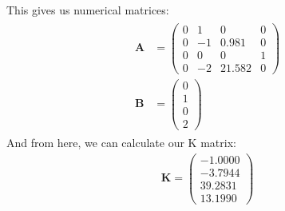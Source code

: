 \documentclass{article}
\theoremstyle{plain}
\theoremstyle{definition}
\theoremstyle{remark}
\begin{document}
This gives us numerical matrices:
\begin{gather*}
    \begin{aligned}
        \textbf{A} &= \begin{pmatrix}
            0 & 1 & 0 & 0 \\
            0 & -1 & 0.981 & 0 \\
            0 & 0 & 0 & 1 \\
            0 & -2 & 21.582 & 0
        \end{pmatrix} \\
        \textbf{B} &= \begin{pmatrix}
            0 \\
            1 \\
            0 \\
            2
        \end{pmatrix}
    \end{aligned}
\end{gather*}
And from here, we can calculate our K matrix:
\begin{gather*}
    \textbf{K} = \begin{pmatrix}
        -1.0000 \\
        -3.7944 \\
        39.2831 \\
        13.1990
    \end{pmatrix}
\end{gather*}
\end{document}
